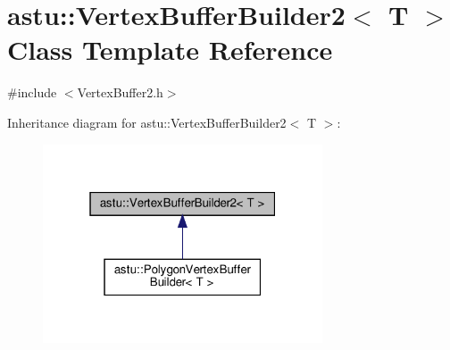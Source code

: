 \hypertarget{classastu_1_1VertexBufferBuilder2}{}\section{astu\+:\+:Vertex\+Buffer\+Builder2$<$ T $>$ Class Template Reference}
\label{classastu_1_1VertexBufferBuilder2}


{\ttfamily \#include $<$Vertex\+Buffer2.\+h$>$}



Inheritance diagram for astu\+:\+:Vertex\+Buffer\+Builder2$<$ T $>$\+:\nopagebreak
\begin{figure}[H]
\begin{center}
\leavevmode
\includegraphics[width=235pt]{classastu_1_1VertexBufferBuilder2__inherit__graph}
\end{center}
\end{figure}
